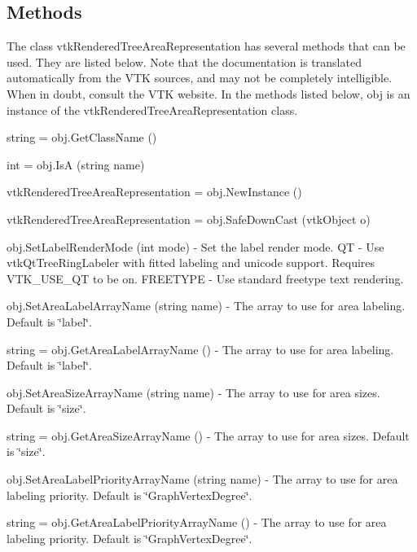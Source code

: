  \hypertarget{vtkwidgets_vtkxyplotwidget_Methods}{}\subsection{Methods}\label{vtkwidgets_vtkxyplotwidget_Methods}
The class vtk\-Rendered\-Tree\-Area\-Representation has several methods that can be used. They are listed below. Note that the documentation is translated automatically from the V\-T\-K sources, and may not be completely intelligible. When in doubt, consult the V\-T\-K website. In the methods listed below, {\ttfamily obj} is an instance of the vtk\-Rendered\-Tree\-Area\-Representation class. 
\begin{DoxyItemize}
\item {\ttfamily string = obj.\-Get\-Class\-Name ()}  
\item {\ttfamily int = obj.\-Is\-A (string name)}  
\item {\ttfamily vtk\-Rendered\-Tree\-Area\-Representation = obj.\-New\-Instance ()}  
\item {\ttfamily vtk\-Rendered\-Tree\-Area\-Representation = obj.\-Safe\-Down\-Cast (vtk\-Object o)}  
\item {\ttfamily obj.\-Set\-Label\-Render\-Mode (int mode)} -\/ Set the label render mode. Q\-T -\/ Use vtk\-Qt\-Tree\-Ring\-Labeler with fitted labeling and unicode support. Requires V\-T\-K\-\_\-\-U\-S\-E\-\_\-\-Q\-T to be on. F\-R\-E\-E\-T\-Y\-P\-E -\/ Use standard freetype text rendering.  
\item {\ttfamily obj.\-Set\-Area\-Label\-Array\-Name (string name)} -\/ The array to use for area labeling. Default is \char`\"{}label\char`\"{}.  
\item {\ttfamily string = obj.\-Get\-Area\-Label\-Array\-Name ()} -\/ The array to use for area labeling. Default is \char`\"{}label\char`\"{}.  
\item {\ttfamily obj.\-Set\-Area\-Size\-Array\-Name (string name)} -\/ The array to use for area sizes. Default is \char`\"{}size\char`\"{}.  
\item {\ttfamily string = obj.\-Get\-Area\-Size\-Array\-Name ()} -\/ The array to use for area sizes. Default is \char`\"{}size\char`\"{}.  
\item {\ttfamily obj.\-Set\-Area\-Label\-Priority\-Array\-Name (string name)} -\/ The array to use for area labeling priority. Default is \char`\"{}\-Graph\-Vertex\-Degree\char`\"{}.  
\item {\ttfamily string = obj.\-Get\-Area\-Label\-Priority\-Array\-Name ()} -\/ The array to use for area labeling priority. Default is \char`\"{}\-Graph\-Vertex\-Degree\char`\"{}.  

\end{DoxyItemize}
